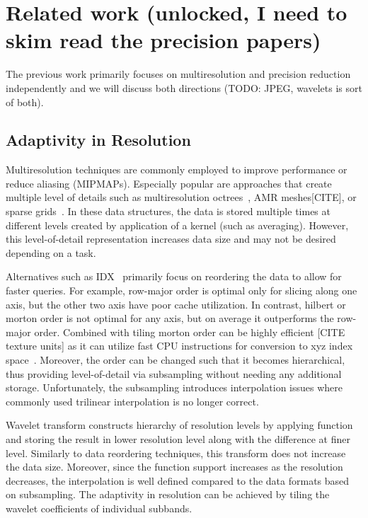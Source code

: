\section{Related work (unlocked, I need to skim read the precision papers)}

The previous work primarily focuses on multiresolution and precision
reduction independently and we will discuss both directions
(TODO: JPEG, wavelets is sort of both).


\subsection{Adaptivity in Resolution}
Multiresolution techniques are commonly employed to improve performance or
reduce aliasing (MIPMAPs). Especially popular are approaches that create
multiple level of details such as multiresolution octrees~\cite{multires_octree1999},
AMR meshes[CITE], or sparse grids~\cite{vdb2013, spgrid2014}. In these data structures,
the data is stored multiple times at different levels created by application of a kernel
(such as averaging). However, this level-of-detail representation increases data size
and may not be desired depending on a task.

Alternatives such as IDX~\cite{idx2001} primarily focus on reordering the data to allow
for faster queries. For example, row-major order is optimal only for slicing
along one axis, but the other two axis have poor cache utilization. In contrast, hilbert
or morton order is not optimal for any axis, but on average it outperforms the row-major
order. Combined with tiling morton order can be highly efficient [CITE texture units] as
it can utilize fast CPU instructions for conversion to xyz index space~\cite{spgrid2014}.
Moreover, the order can be changed such that it becomes hierarchical, thus providing
level-of-detail via subsampling without needing any additional storage. Unfortunately,
the subsampling introduces interpolation issues where commonly used trilinear interpolation
is no longer correct.

Wavelet transform constructs hierarchy of resolution levels by applying function and storing
the result in lower resolution level along with the difference at finer level. Similarly to
data reordering techniques, this transform does not increase the data size. Moreover, since
the function support increases as the resolution decreases, the interpolation is well defined
compared to the data formats based on subsampling. The adaptivity in resolution can be achieved
by tiling the wavelet coefficients of individual subbands.

